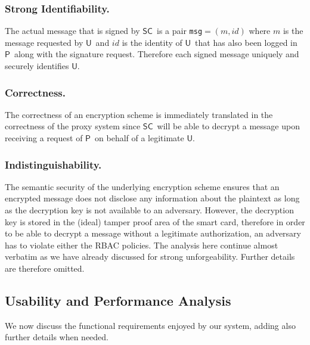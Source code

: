 \documentclass[preprint,authoryear,12pt]{elsarticle}
\newcommand{\User}{\ensuremath{\mathsf{U}}}
\newcommand{\Proxy}{\ensuremath{\mathsf{P}}}
\newcommand{\SC}{\ensuremath{\mathsf{SC}}}
\begin{document}
\subsubsection{Strong Identifiability.} The actual message that is signed by \SC\ is a pair {\tt msg}$=(m,id)$ where $m$ is the message requested by \User\ and $id$ is the identity of \User\ that has also been logged in \Proxy\ along with the signature request. Therefore each signed message uniquely and securely identifies \User.

\subsubsection{Correctness.} The correctness of an encryption scheme is immediately translated in the correctness of the proxy system since \SC\ will be able to decrypt a message upon receiving a request of \Proxy\ on behalf of a legitimate \User.

\subsubsection{Indistinguishability.} The semantic security of the underlying encryption scheme ensures that an encrypted message does not disclose any information about the plaintext as long as the decryption key is not available to an adversary. However, the decryption key is stored in the (ideal) tamper proof area of the smart card, therefore in order to be able to decrypt a message without a legitimate authorization, an adversary has to violate either the RBAC policies. %
The analysis here continue almost verbatim as we have already discussed for strong unforgeability. Further details are therefore omitted.

\subsection{Usability and Performance Analysis}
We now discuss the functional requirements enjoyed by our system, adding also further details when needed.
\end{document}
